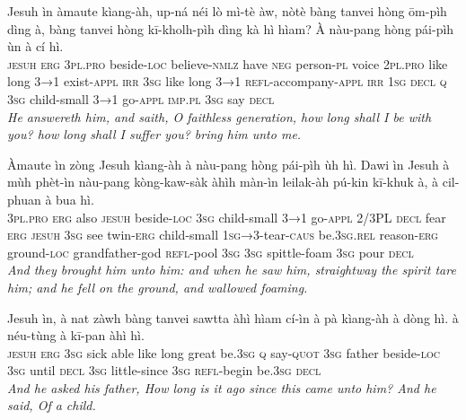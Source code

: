 \documentclass[11pt,a4paper]{article}
\begin{document}
\begin{exe}
\gll Jesuh ìn àmaute kìang-àh, up-ná néi lò mì-tè àw, nòtè bàng tanvei hòng ōm-pìh dìng à, bàng tanvei hòng kī-kholh-pìh dìng kà hì hìam? À nàu-pang hòng pái-pìh ùn à cí hì. \\
     \textsc{jesuh} \textsc{erg} \textsc{3pl}.\textsc{pro} beside-\textsc{loc} believe-\textsc{nmlz} have \textsc{neg} person-\textsc{pl} voice \textsc{2pl}.\textsc{pro} like long \textsc{3→1} exist-\textsc{appl} \textsc{irr} \textsc{3sg} like long \textsc{3→1} \textsc{refl}-accompany-\textsc{appl} \textsc{irr} \textsc{1sg} \textsc{decl} \textsc{q} \textsc{3sg} child-small \textsc{3→1} go-\textsc{appl} \textsc{imp}.\textsc{pl} \textsc{3sg} say \textsc{decl} \\
\glt \textcolor{kjvcolor}{\textit{He answereth him, and saith, O faithless generation, how long shall I be with you? how long shall I suffer you? bring him unto me.}}

\gll Àmaute ìn zòng Jesuh kìang-àh à nàu-pang hòng pái-pìh ùh hì. Dawi ìn Jesuh à mùh phèt-ìn nàu-pang kòng-kaw-sàk àhìh màn-ìn leilak-àh pú-kin kī-khuk à, à cil-phuan à bua hì. \\
     \textsc{3pl}.\textsc{pro} \textsc{erg} also \textsc{jesuh} beside-\textsc{loc} \textsc{3sg} child-small \textsc{3→1} go-\textsc{appl} 2/3PL \textsc{decl} fear \textsc{erg} \textsc{jesuh} \textsc{3sg} see twin-\textsc{erg} child-small \textsc{1sg→3}-tear-\textsc{caus} be.\textsc{3sg}.\textsc{rel} reason-\textsc{erg} ground-\textsc{loc} grandfather-god \textsc{refl}-pool \textsc{3sg} \textsc{3sg} spittle-foam \textsc{3sg} pour \textsc{decl} \\
\glt \textcolor{kjvcolor}{\textit{And they brought him unto him: and when he saw him, straightway the spirit tare him; and he fell on the ground, and wallowed foaming.}}

\gll Jesuh ìn, à nat zàwh bàng tanvei sawtta àhì hìam cí-ìn à pà kìang-àh à dòng hì. à néu-tùng à kī-pan àhì hì. \\
     \textsc{jesuh} \textsc{erg} \textsc{3sg} sick able like long great be.\textsc{3sg} \textsc{q} say-\textsc{quot} \textsc{3sg} father beside-\textsc{loc} \textsc{3sg} until \textsc{decl} \textsc{3sg} little-since \textsc{3sg} \textsc{refl}-begin be.\textsc{3sg} \textsc{decl} \\
\glt \textcolor{kjvcolor}{\textit{And he asked his father, How long is it ago since this came unto him? And he said, Of a child.}}


\end{exe}
\end{document}
